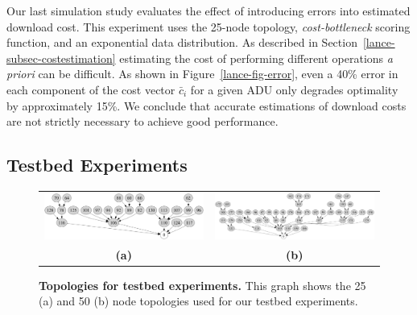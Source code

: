 Our last simulation study evaluates the effect of introducing errors into
estimated download cost. This experiment uses the 25-node topology,
\textit{cost-bottleneck} scoring function, and an exponential data
distribution. As described in Section~\ref{lance-subsec-costestimation}
estimating the cost of performing different operations \textit{a priori} can
be difficult. As shown in Figure~\ref{lance-fig-error}, even a 40\% error in
each component of the cost vector $\bar{c}_i$ for a given ADU only degrades
optimality by approximately 15\%. We conclude that accurate estimations of
download costs are not strictly necessary to achieve good performance.

\subsection{Testbed Experiments}
\label{lance-sec-eval-policies}

\begin{figure}[t]
\begin{center}
\begin{tabular}{cc}
\includegraphics[width=0.45\hsize]{./4-lance/figs/topology25.pdf} &
\includegraphics[width=0.45\hsize]{./4-lance/figs/topology50.pdf} \\
\textbf{(a)} &
\textbf{(b)} \\
\end{tabular}
\end{center}

\caption{\textbf{Topologies for testbed experiments.} This graph shows the 25
(a) and 50 (b) node topologies used for our testbed experiments.}

\label{lance-fig-topology}
\end{figure}

